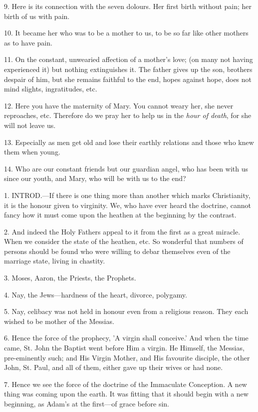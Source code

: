 9. Here is its connection with the seven dolours.
Her first birth without pain; her birth of us with pain.

10. It became her who was to be a mother to us,
to be so far like other mothers as to have pain.

11. On the constant, unwearied affection of a
mother's love; (on many not having experienced it) but nothing
extinguishes it. The father gives up the son, brothers despair of him,
but she remains faithful to the end, hopes against hope, does not mind
slights, ingratitudes, etc.

12. Here you have the maternity of Mary. You
cannot weary her, she never reproaches, etc. Therefore do we pray her
to help us in the \emph{hour of death}, for she will not leave us.

13. Especially as men get old and lose their
earthly relations and those who knew them when young.

14. Who are our constant friends but our guardian
angel, who has been with us since our youth, and Mary, who will be
with us to the end?


1. INTROD.—If
there is one thing more than another which marks Christianity, it is
the honour given to virginity. We, who have ever heard the doctrine,
cannot fancy how it must come upon the heathen at the beginning by the
contrast.

2. And indeed the Holy Fathers appeal to it from
the first as a great miracle. When we consider the state of the
heathen, etc. So wonderful that numbers of persons should be
found who were willing to debar themselves even of the marriage state,
living in chastity.

3. Moses, Aaron, the Priests, the Prophets.

4. Nay, the Jews—hardness of the heart,
divorce, polygamy.

5. Nay, celibacy was not held in honour even from
a religious reason. They each wished to be mother of the Messias.

6. Hence the force of the prophecy, 'A virgin
shall conceive.' And when the time came, St. John the Baptist went
before Him a virgin. He Himself, the Messias, pre-eminently such; and
His Virgin Mother, and His favourite disciple, the other John, St.
Paul, and all of them, either gave up their wives or had none.

7. Hence we see the force of the doctrine of the
Immaculate Conception. A new thing was coming upon the earth. It was
fitting that it should begin with a new beginning, as Adam's at the
first—of grace before sin.

